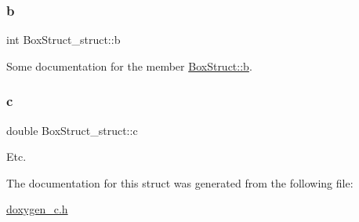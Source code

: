 \subsubsection{\texorpdfstring{b}{b}}
{\footnotesize\ttfamily int Box\+Struct\+\_\+struct\+::b}

Some documentation for the member \mbox{\hyperlink{struct_box_struct__struct_aee44748dc579c5d794853ee8b133d197}{Box\+Struct\+::b}}. \mbox{\label{struct_box_struct__struct_a4543370ed67b2cf5ae3f55201bea11e6}} 
\subsubsection{\texorpdfstring{c}{c}}
{\footnotesize\ttfamily double Box\+Struct\+\_\+struct\+::c}

Etc. 

The documentation for this struct was generated from the following file\+:\begin{DoxyCompactItemize}
\item 
\mbox{\hyperlink{doxygen__c_8h}{doxygen\+\_\+c.\+h}}\end{DoxyCompactItemize}
